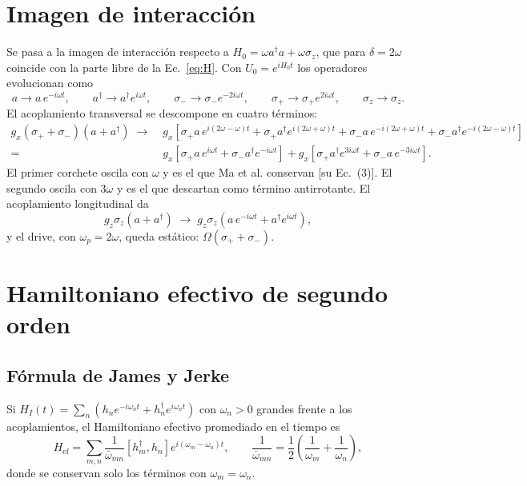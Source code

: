 \documentclass[11pt]{report}
\newcommand{\spl}{\sigma_{+}}
\newcommand{\smi}{\sigma_{-}}
\begin{document}
\section{Imagen de interacci\'on}

Se pasa a la imagen de interacci\'on respecto a $H_{0}=\omega a^{\dagger}a+\omega\sigma_{z}$, que para $\delta=2\omega$ coincide con la parte libre de la Ec.~\eqref{eq:H}. Con $U_{0}=e^{iH_{0}t}$ los operadores evolucionan como
\begin{equation}
a\to a\,e^{-i\omega t},\qquad a^{\dagger}\to a^{\dagger}e^{i\omega t},\qquad \smi\to\smi e^{-2i\omega t},\qquad \spl\to\spl e^{2i\omega t},\qquad \sigma_{z}\to\sigma_{z}.
\end{equation}
El acoplamiento transversal se descompone en cuatro t\'erminos:
\begin{align}
g_{x}(\spl+\smi)(a+a^{\dagger}) \;\to\;& g_{x}\left[\spl a\,e^{i(2\omega-\omega)t} + \spl a^{\dagger}e^{i(2\omega+\omega)t} + \smi a\,e^{-i(2\omega+\omega)t} + \smi a^{\dagger}e^{-i(2\omega-\omega)t}\right]\nonumber\\
=\;& g_{x}\left[\spl a\,e^{i\omega t} + \smi a^{\dagger}e^{-i\omega t}\right] + g_{x}\left[\spl a^{\dagger}e^{3i\omega t} + \smi a\,e^{-3i\omega t}\right].
\label{eq:Vx}
\end{align}
El primer corchete oscila con $\omega$ y es el que Ma et al. conservan [su Ec.~(3)]. El segundo oscila con $3\omega$ y es el que descartan como t\'ermino antirrotante. El acoplamiento longitudinal da
\begin{equation}
g_{z}\sigma_{z}(a+a^{\dagger}) \;\to\; g_{z}\sigma_{z}\left(a\,e^{-i\omega t}+a^{\dagger}e^{i\omega t}\right),
\end{equation}
y el drive, con $\omega_{p}=2\omega$, queda est\'atico: $\Omega(\spl+\smi)$.

\section{Hamiltoniano efectivo de segundo orden}

\subsection{F\'ormula de James y Jerke}

Si $H_{I}(t)=\sum_{n}\left(h_{n}e^{-i\omega_{n}t}+h_{n}^{\dagger}e^{i\omega_{n}t}\right)$ con $\omega_{n}>0$ grandes frente a los acoplamientos, el Hamiltoniano efectivo promediado en el tiempo es \cite{JamesJerke2007}
\begin{equation}
H_{\mathrm{ef}} = \sum_{m,n}\frac{1}{\bar\omega_{mn}}\left[h_{m}^{\dagger},h_{n}\right]e^{i(\omega_{m}-\omega_{n})t},\qquad \frac{1}{\bar\omega_{mn}}=\frac{1}{2}\left(\frac{1}{\omega_{m}}+\frac{1}{\omega_{n}}\right),
\label{eq:JJ}
\end{equation}
donde se conservan solo los t\'erminos con $\omega_{m}=\omega_{n}$.
\end{document}
